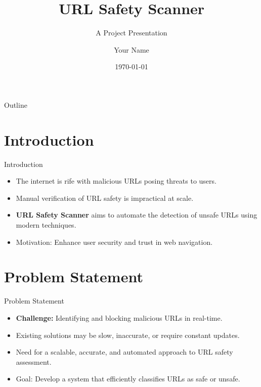 \documentclass{beamer}
\title{URL Safety Scanner}
\subtitle{A Project Presentation}
\author{Your Name}
\institute{Your Institution}
\date{\today}
\begin{document}
\begin{frame}
  \titlepage
\end{frame}

\begin{frame}{Outline}
  \tableofcontents
\end{frame}

\section{Introduction}
\begin{frame}{Introduction}
  \begin{itemize}
    \item The internet is rife with malicious URLs posing threats to users.
    \item Manual verification of URL safety is impractical at scale.
    \item \textbf{URL Safety Scanner} aims to automate the detection of unsafe URLs using modern techniques.
    \item Motivation: Enhance user security and trust in web navigation.
  \end{itemize}
\end{frame}

\section{Problem Statement}
\begin{frame}{Problem Statement}
  \begin{itemize}
    \item \textbf{Challenge:} Identifying and blocking malicious URLs in real-time.
    \item Existing solutions may be slow, inaccurate, or require constant updates.
    \item Need for a scalable, accurate, and automated approach to URL safety assessment.
    \item Goal: Develop a system that efficiently classifies URLs as safe or unsafe.
  \end{itemize}
\end{frame}

\end{document}
